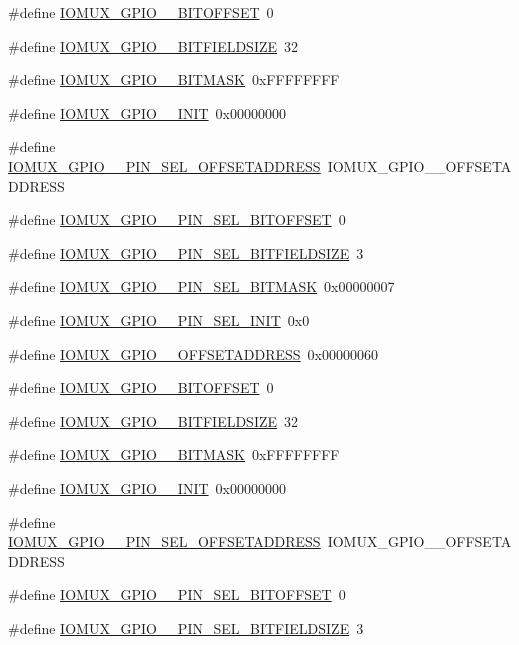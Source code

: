 \begin{DoxyCompactItemize}
\#define \hyperlink{a00560_a1253dfd5e67c793c1f016cd91762226d}{IOMUX\_\-GPIO\_\_\-BITOFFSET}~0
\item 
\#define \hyperlink{a00560_a28570d7214cf62fed6f6ae54b8e1f273}{IOMUX\_\-GPIO\_\_\-BITFIELDSIZE}~32
\item 
\#define \hyperlink{a00560_a4f49fc54edd47a0df3a6a82f1c6f619b}{IOMUX\_\-GPIO\_\_\-BITMASK}~0xFFFFFFFF
\item 
\#define \hyperlink{a00560_a2b27febf70b78d098c7e3bcb5b04c356}{IOMUX\_\-GPIO\_\_\-INIT}~0x00000000
\item 
\#define \hyperlink{a00560_a922862e90a2bdc9b55303e998e763854}{IOMUX\_\-GPIO\_\_\-PIN\_\-SEL\_\-OFFSETADDRESS}~IOMUX\_\-GPIO\_\_\-OFFSETADDRESS
\item 
\#define \hyperlink{a00560_a75110dea676d86edae25945e410127b6}{IOMUX\_\-GPIO\_\_\-PIN\_\-SEL\_\-BITOFFSET}~0
\item 
\#define \hyperlink{a00560_aca71f96ec45da9505a5a1ded9defdf67}{IOMUX\_\-GPIO\_\_\-PIN\_\-SEL\_\-BITFIELDSIZE}~3
\item 
\#define \hyperlink{a00560_ab6daf4a91e7adb176e1aa7438d3b3b72}{IOMUX\_\-GPIO\_\_\-PIN\_\-SEL\_\-BITMASK}~0x00000007
\item 
\#define \hyperlink{a00560_a72878c294fa7c35e6fe3cadac8875345}{IOMUX\_\-GPIO\_\_\-PIN\_\-SEL\_\-INIT}~0x0
\item 
\#define \hyperlink{a00560_a35a46d57b267d95f74407364f08ca91d}{IOMUX\_\-GPIO\_\_\-OFFSETADDRESS}~0x00000060
\item 
\#define \hyperlink{a00560_a5cb71e00abbea44cf3072e41693cb6aa}{IOMUX\_\-GPIO\_\_\-BITOFFSET}~0
\item 
\#define \hyperlink{a00560_a78408c6702d38bc6dc4510a61a5a08da}{IOMUX\_\-GPIO\_\_\-BITFIELDSIZE}~32
\item 
\#define \hyperlink{a00560_aeb02cd5bef59152636b389c99033a4f2}{IOMUX\_\-GPIO\_\_\-BITMASK}~0xFFFFFFFF
\item 
\#define \hyperlink{a00560_afd0846f5ac2d4420bf963dff53a24d76}{IOMUX\_\-GPIO\_\_\-INIT}~0x00000000
\item 
\#define \hyperlink{a00560_abd25699335834ea52d77ff600f734310}{IOMUX\_\-GPIO\_\_\-PIN\_\-SEL\_\-OFFSETADDRESS}~IOMUX\_\-GPIO\_\_\-OFFSETADDRESS
\item 
\#define \hyperlink{a00560_a29f064194c13da031a640d7502be7d96}{IOMUX\_\-GPIO\_\_\-PIN\_\-SEL\_\-BITOFFSET}~0
\item 
\#define \hyperlink{a00560_aabe2a724bf5c123e363bbb96f5a80c7c}{IOMUX\_\-GPIO\_\_\-PIN\_\-SEL\_\-BITFIELDSIZE}~3

\end{DoxyCompactItemize}
